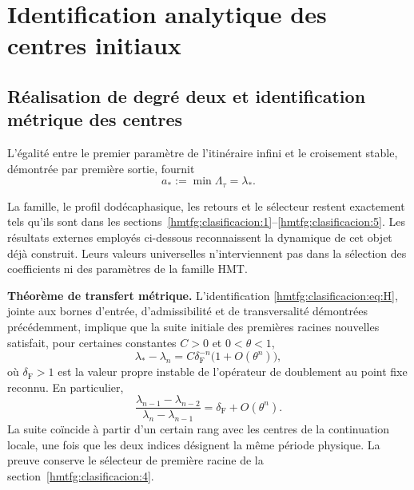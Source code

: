 \section{Identification analytique des centres initiaux}
\label{hmtfg:fragmento:identificacion-analitica-de-los-centros-originales}

\subsection{Réalisation de degré deux et identification métrique des centres}
\label{hmtfg:clasificacion:8}

L’égalité entre le premier paramètre de l’itinéraire infini et le croisement stable, démontrée par première sortie, fournit
\begin{equation}
\boxed{a_*:=\min\Lambda_\tau=\lambda_*.}
\label{hmtfg:clasificacion:eq:H}
\end{equation}

La famille, le profil dodécaphasique, les retours et le sélecteur restent exactement tels qu’ils sont dans les sections~\ref{hmtfg:clasificacion:1}--\ref{hmtfg:clasificacion:5}. Les résultats externes employés ci-dessous reconnaissent la dynamique de cet objet déjà construit. Leurs valeurs universelles n’interviennent pas dans la sélection des coefficients ni des paramètres de la famille HMT.

\textbf{Théorème de transfert métrique.} L’identification \eqref{hmtfg:clasificacion:eq:H}, jointe aux bornes d’entrée, d’admissibilité et de transversalité démontrées précédemment, implique que la suite initiale des premières racines nouvelles satisfait, pour certaines constantes \(C>0\) et \(0<\theta<1\),
\begin{equation}
\boxed{\lambda_*-\lambda_n=C\delta_{\mathrm F}^{-n}
\bigl(1+O(\theta^n)\bigr),}
\label{hmtfg:clasificacion:eq:14}
\end{equation}
où \(\delta_{\mathrm F}>1\) est la valeur propre instable de l’opérateur de doublement au point fixe reconnu. En particulier,
\begin{equation}
\frac{\lambda_{n-1}-\lambda_{n-2}}
     {\lambda_n-\lambda_{n-1}}
=\delta_{\mathrm F}+O(\theta^n).
\label{hmtfg:clasificacion:eq:15}
\end{equation}
La suite coïncide à partir d’un certain rang avec les centres de la continuation locale, une fois que les deux indices désignent la même période physique. La preuve conserve le sélecteur de première racine de la section~\ref{hmtfg:clasificacion:4}.

